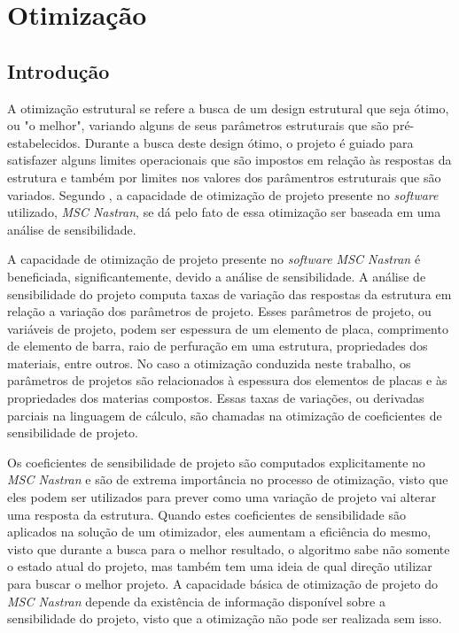 \chapter[Otimização]{Otimização}

\section{Introdução}
A otimização estrutural se refere a busca de um design estrutural que seja ótimo, ou "o melhor", variando alguns de seus parâmetros estruturais que são pré-estabelecidos. Durante a busca deste design ótimo, o projeto é guiado para satisfazer alguns limites operacionais que são impostos em relação às respostas da estrutura e também por limites nos valores dos parâmentros estruturais que são variados. Segundo \cite{moore1994msc}, a capacidade de otimização de projeto presente no \emph{software} utilizado, \emph{MSC Nastran}, se dá pelo fato de essa otimização ser baseada em uma análise de sensibilidade.

A capacidade de otimização de projeto presente no \emph{software MSC Nastran} é beneficiada, significantemente, devido a análise de sensibilidade. A análise de sensibilidade do projeto computa taxas de variação das respostas da estrutura em relação a variação dos parâmetros de projeto. Esses parâmetros de projeto, ou variáveis de projeto, podem ser espessura de um elemento de placa, comprimento de elemento de barra, raio de perfuração em uma estrutura, propriedades dos materiais, entre outros. No caso a otimização conduzida neste trabalho, os parâmetros de projetos são relacionados à espessura dos elementos de placas e às propriedades dos materias compostos. Essas taxas de variações, ou derivadas parciais na linguagem de cálculo, são chamadas na otimização de coeficientes de sensibilidade de projeto.

Os coeficientes de sensibilidade de projeto são computados explicitamente no \emph{MSC Nastran} e são de extrema importância no processo de otimização, visto que eles podem ser utilizados para prever como uma variação de projeto vai alterar uma resposta da estrutura. Quando estes coeficientes de sensibilidade são aplicados na solução de um otimizador, eles aumentam a eficiência do mesmo, visto que durante a busca para o melhor resultado, o algoritmo sabe não somente o estado atual do projeto, mas também tem uma ideia de qual direção utilizar para buscar o melhor projeto. A capacidade básica de otimização de projeto do \emph{MSC Nastran} depende da existência de informação disponível sobre a sensibilidade do projeto, visto que a otimização não pode ser realizada sem isso.


